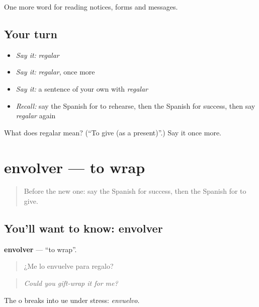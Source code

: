 \begin{grammarlens}[title={What you've built}]
One more word for reading notices, forms and messages.
\end{grammarlens}

\subsection*{Your turn}
\begin{itemize}
\raggedright
  \item \emph{Say it:} \emph{regalar}
  \item \emph{Say it:} \emph{regalar}, once more
  \item \emph{Say it:} a sentence of your own with \emph{regalar}
  \item \emph{Recall:} say the Spanish for to rehearse, then the Spanish for success, then say \emph{regalar} again
\end{itemize}

\begin{tcolorbox}[breakable,colback=teal!4,colframe=teal!35!black,title={Before you move on}]
What does regalar mean? (\textquotedblleft{}To give (as a present)\textquotedblright{}.) Say it once more.
\end{tcolorbox}
\section[envolver]{envolver — to wrap}

\label{lesson:ES-C506-envolver}



\begin{quote}
Before the new one: say the Spanish for success, then the Spanish for to give.
\end{quote}

\subsection*{You'll want to know: envolver}
\textbf{envolver} — \textquotedblleft{}to wrap\textquotedblright{}.

\begin{quote}
¿Me lo envuelve para regalo?
\end{quote}

\begin{quote}
\emph{Could you gift-wrap it for me?}
\end{quote}

The o breaks into ue under stress: \emph{envuelvo}.


